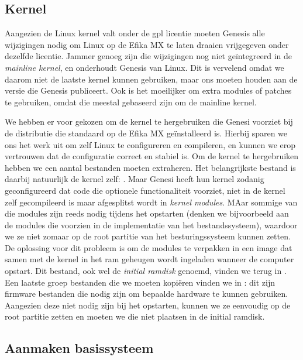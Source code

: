 \subsection{Kernel}
\label{kiosk:deployment:besturingssysteem:kernel}

Aangezien de Linux kernel valt onder de \ac{gpl} licentie moeten Genesis alle wijzigingen nodig om Linux op de Efika MX te laten draaien vrijgegeven onder dezelfde licentie. Jammer genoeg zijn die wijzigingen nog niet geïntegreerd in de \emph{mainline kernel}, en onderhoudt Genesis  van Linux. Dit is vervelend omdat we daarom niet de laatste kernel kunnen gebruiken, maar ons moeten houden aan de versie die Genesis publiceert. Ook is het moeilijker om extra modules of patches te gebruiken, omdat die meestal gebaseerd zijn om de mainline kernel.

We hebben er voor gekozen om de kernel te hergebruiken die Genesi voorziet bij de distributie die standaard op de Efika MX geïnstalleerd is. Hierbij sparen we ons het werk uit om zelf Linux te configureren en compileren, en kunnen we erop vertrouwen dat de configuratie correct en stabiel is. Om de kernel te hergebruiken hebben we een aantal bestanden moeten extraheren. Het belangrijkste bestand is daarbij natuurlijk de kernel zelf: . Maar Genesi heeft hun kernel zodanig geconfigureerd dat code die optionele functionaliteit voorziet, niet in de kernel zelf gecompileerd is maar afgesplitst wordt in \emph{kernel modules}. MAar sommige van die modules zijn reeds nodig tijdens het opstarten (denken we bijvoorbeeld aan de modules die voorzien in de implementatie van het bestandssysteem), waardoor we ze niet zomaar op de root partitie van het besturingssysteem kunnen zetten. De oplossing voor dit probleem is om de modules te verpakken in een image dat samen met de kernel in het \ac{ram} geheugen wordt ingeladen wanneer de computer opstart. Dit bestand, ook wel de \emph{initial ramdisk} genoemd, vinden we terug in . Een laatste groep bestanden die we moeten kopiëren vinden we in : dit zijn firmware bestanden die nodig zijn om bepaalde hardware te kunnen gebruiken. Aangezien deze niet nodig zijn bij het opstarten, kunnen we ze eenvoudig op de root partitie zetten en moeten we die niet plaatsen in de initial ramdisk.

\subsection{Aanmaken basissysteem}
\label{kiosk:deployment:besturingssysteem:basissysteem}

